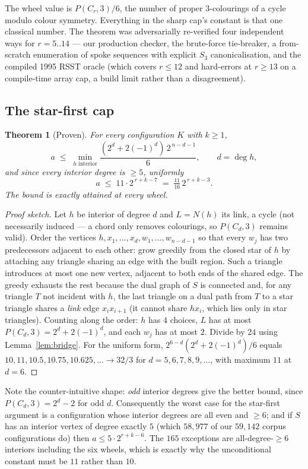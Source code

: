\documentclass[11pt]{article}
\newtheorem{theorem}{Theorem}[section]
\theoremstyle{definition}
\begin{document}
The wheel value is $P(C_r,3)/6$, the number of proper $3$-colourings of a cycle
modulo colour symmetry. Everything in the sharp cap's constant is that one classical
number. The theorem was adversarially re-verified four independent ways for
$r=5..14$ --- our production checker, the brute-force tie-breaker, a from-scratch
enumeration of spoke sequences with explicit $S_3$ canonicalisation, and the compiled
1995 RSST oracle (which covers $r \le 12$ and hard-errors at $r\ge13$ on a
compile-time array cap, a build limit rather than a disagreement).

\subsection{The star-first cap}

\begin{theorem}[Proven]
\label{thm:star}
For every configuration $K$ with $k\ge1$,
\[
   a \;\le\; \min_{h \text{ interior}} \frac{(2^{d}+2(-1)^{d})\,2^{\,n-d-1}}{6},
   \qquad d = \deg h,
\]
and since every interior degree is $\ge 5$, uniformly
\[
   \boxed{\;a \;\le\; 11\cdot 2^{\,r+k-7} \;=\; \tfrac{11}{16}\,2^{\,r+k-3}.\;}
\]
The bound is exactly attained at every wheel.
\end{theorem}

\begin{proof}[Proof sketch]
Let $h$ be interior of degree $d$ and $L=N(h)$ its link, a cycle (not necessarily
induced --- a chord only removes colourings, so $P(C_d,3)$ remains valid). Order the
vertices $h, x_1,\dots,x_d, w_1,\dots,w_{n-d-1}$ so that every $w_j$ has two
predecessors adjacent to each other: grow greedily from the closed star of $h$ by
attaching any triangle sharing an edge with the built region. Such a triangle
introduces at most one new vertex, adjacent to both ends of the shared edge. The
greedy exhausts the rest because the dual graph of $S$ is connected and, for any
triangle $T$ not incident with $h$, the last triangle on a dual path from $T$ to a
star triangle shares a \emph{link} edge $x_i x_{i+1}$ (it cannot share $hx_i$, which
lies only in star triangles). Counting along the order: $h$ has $4$ choices, $L$ has
at most $P(C_d,3)=2^d+2(-1)^d$, and each $w_j$ has at most $2$. Divide by $24$ using
Lemma~\ref{lem:bridge}. For the uniform form, $2^{6-d}(2^d+2(-1)^d)/6$ equals
$10, 11, 10.5, 10.75, 10.625, \dots \to 32/3$ for $d = 5,6,7,8,9,\dots$, with maximum
$11$ at $d=6$.
\end{proof}

Note the counter-intuitive shape: \emph{odd} interior degrees give the better bound,
since $P(C_d,3) = 2^d-2$ for odd $d$. Consequently the worst case for the star-first
argument is a configuration whose interior degrees are all even and $\ge6$; and if
$S$ has an interior vertex of degree exactly $5$ (which $58{,}977$ of our $59{,}142$
corpus configurations do) then $a \le 5\cdot 2^{r+k-6}$. The $165$ exceptions are
all-degree-$\ge6$ interiors including the six wheels, which is exactly why the
unconditional constant must be $11$ rather than $10$.
\end{document}
